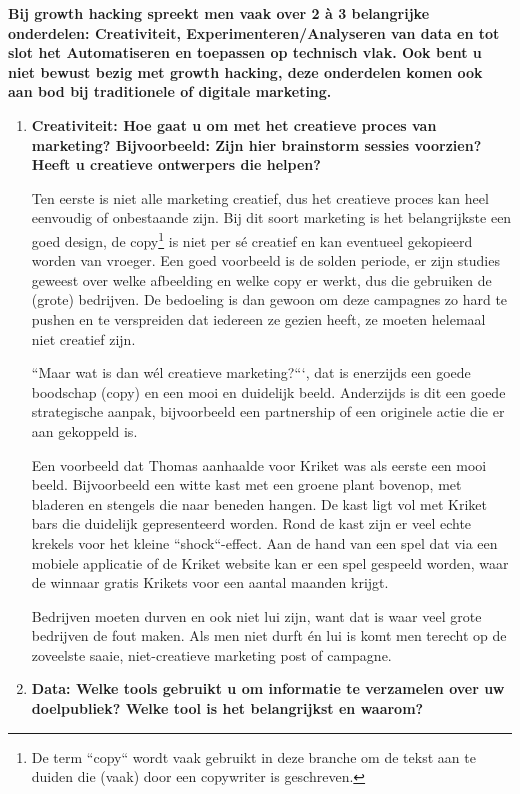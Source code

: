 \textbf{Bij growth hacking spreekt men vaak over 2 à 3 belangrijke onderdelen: Creativiteit, Experimenteren/Analyseren van data en tot slot het Automatiseren en toepassen op technisch vlak. Ook bent u niet bewust bezig met growth hacking, deze onderdelen komen ook aan bod bij traditionele of digitale marketing.}
\begin{enumerate}[label*=\arabic*.]
	\item \textbf{Creativiteit: Hoe gaat u om met het creatieve proces van marketing? Bijvoorbeeld: Zijn hier brainstorm sessies voorzien? Heeft u creatieve ontwerpers die helpen?}
	
	Ten eerste is niet alle marketing creatief, dus het creatieve proces kan heel eenvoudig of onbestaande zijn. Bij dit soort marketing is het belangrijkste een goed design, de copy\footnote{De term ``copy`` wordt vaak gebruikt in deze branche om de tekst aan te duiden die (vaak) door een copywriter is geschreven.} is niet per sé creatief en kan eventueel gekopieerd worden van vroeger. Een goed voorbeeld is de solden periode, er zijn studies geweest over welke afbeelding en welke copy er werkt, dus die gebruiken de (grote) bedrijven. De bedoeling is dan gewoon om deze campagnes zo hard te pushen en te verspreiden dat iedereen ze gezien heeft, ze moeten helemaal niet creatief zijn.
	
	``Maar wat is dan wél creatieve marketing?```, dat is enerzijds een goede boodschap (copy) en een mooi en duidelijk beeld. Anderzijds is dit een goede strategische aanpak, bijvoorbeeld een partnership of een originele actie die er aan gekoppeld is.
	
	Een voorbeeld dat Thomas aanhaalde voor Kriket was als eerste een mooi beeld. Bijvoorbeeld een witte kast met een groene plant bovenop, met bladeren en stengels die naar beneden hangen. De kast ligt vol met Kriket bars die duidelijk gepresenteerd worden. Rond de kast zijn er veel echte krekels voor het kleine ``shock``-effect. Aan de hand van een spel dat via een mobiele applicatie of de Kriket website kan er een spel gespeeld worden, waar de winnaar gratis Krikets voor een aantal maanden krijgt.
	
	Bedrijven moeten durven en ook niet lui zijn, want dat is waar veel grote bedrijven de fout maken. Als men niet durft én lui is komt men terecht op de zoveelste saaie, niet-creatieve marketing post of campagne.
	
	\item \textbf{Data: Welke tools gebruikt u om informatie te verzamelen over uw doelpubliek? Welke tool is het belangrijkst en waarom?}
	

\end{enumerate}

